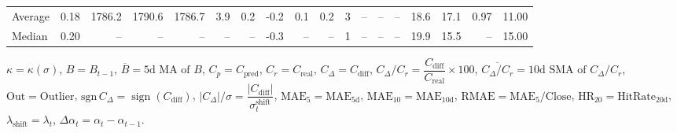 \begin{threeparttable}
{\begin{tabular}{lrrrrrrrrrrrrrrrrr}
Average &     0.18 & 1786.2 & 1790.6 & 1786.7 &        3.9 &            0.2 &                      -0.2 &                      0.1 &                 0.2 &              3 &         -- &        -- &             -- &             18.6 &                17.1 &            0.97 &                  11.00 \\
 Median &     0.20 &     -- &     -- &     -- &         -- &             -- &                      -0.3 &                       -- &                  -- &              1 &         -- &        -- &             -- &             19.9 &                15.5 &              -- &                  15.00 \\
\bottomrule
\end{tabular}
}
\begin{tablenotes}\footnotesize
\item $\kappa=\kappa(\sigma)$, $B=B_{t-1}$, $\overline{B}=\text{5d MA of }B$, $C_p=C_{\text{pred}}$, $C_r=C_{\text{real}}$, $C_\Delta=C_{\text{diff}}$, $C_\Delta/C_r=\dfrac{C_{\text{diff}}}{C_{\text{real}}}\times100$, $\overline{C_\Delta/C_r}=\text{10d SMA of }C_\Delta/C_r$, $\mathrm{Out}=\text{Outlier}$, $\mathrm{sgn}\,C_\Delta=\operatorname{sign}(C_{\text{diff}})$, $|C_\Delta|/\sigma=\dfrac{|C_{\text{diff}}|}{\sigma_t^{\text{shift}}}$, $\mathrm{MAE}_5=\mathrm{MAE}_{5\text{d}}$, $\mathrm{MAE}_{10}=\mathrm{MAE}_{10\text{d}}$, $\mathrm{RMAE}= \mathrm{MAE}_5 / \text{Close}$, $\mathrm{HR}_{20}=\mathrm{HitRate}_{20\text{d}}$, $\lambda_{\text{shift}}=\lambda_t$, $\Delta\alpha_t=\alpha_t-\alpha_{t-1}$.
\end{tablenotes}
\end{threeparttable}
\endgroup

